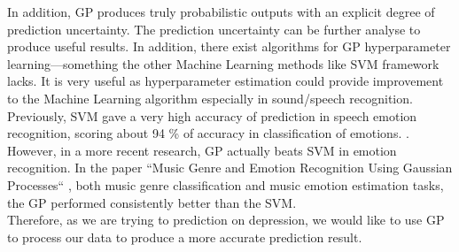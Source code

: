 \documentclass{article}
\begin{document}
	In addition, GP produces truly probabilistic outputs with an explicit degree of prediction uncertainty. 
	The prediction uncertainty can be further analyse to produce useful results. In addition, there exist algorithms for GP hyperparameter 
	learning—something the other Machine Learning methods like SVM framework lacks. It is very useful as hyperparameter estimation could provide 
	improvement to the Machine Learning algorithm especially in sound/speech recognition. \cite{Hashimoto2015} \\

	Previously,  SVM gave a very high accuracy of prediction in speech emotion recognition, scoring about 94 \% 
	of accuracy in classification of emotions. \cite{Chavhan2010}. However, in a more recent research, GP actually beats SVM in emotion recognition. 
	In the paper  “Music Genre and Emotion Recognition Using Gaussian Processes“ \cite{MARKOV2013}, 
	both music genre classification and music emotion estimation tasks, the GP performed consistently better than the SVM. \\

	Therefore, as we are trying to prediction on depression, we would like to use GP to process our data to produce a more accurate prediction result. 
	
\end{document}
